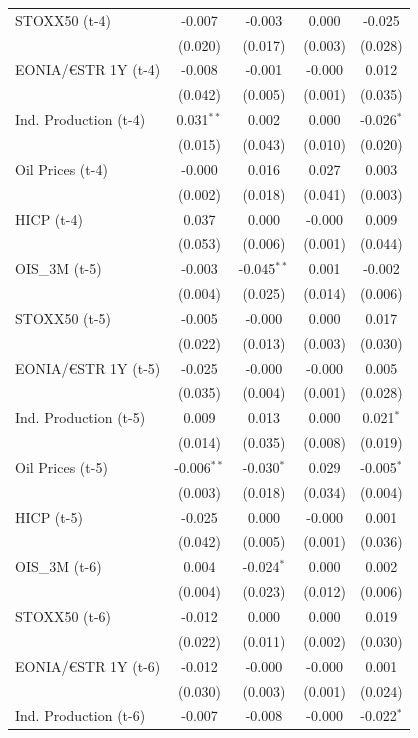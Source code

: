 \begin{longtable}[t]{lcccc}
STOXX50 (t-4) & -0.007 & -0.003 & 0.000 & -0.025\\
 & (0.020) & (0.017) & (0.003) & (0.028)\\
EONIA/€STR 1Y (t-4) & -0.008 & -0.001 & -0.000 & 0.012\\
 & (0.042) & (0.005) & (0.001) & (0.035)\\
Ind. Production (t-4) & 0.031$^{**}$ & 0.002 & 0.000 & -0.026$^{*}$\\
 & (0.015) & (0.043) & (0.010) & (0.020)\\
Oil Prices (t-4) & -0.000 & 0.016 & 0.027 & 0.003\\
 & (0.002) & (0.018) & (0.041) & (0.003)\\
HICP (t-4) & 0.037 & 0.000 & -0.000 & 0.009\\
 & (0.053) & (0.006) & (0.001) & (0.044)\\
OIS\_3M (t-5) & -0.003 & -0.045$^{**}$ & 0.001 & -0.002\\
 & (0.004) & (0.025) & (0.014) & (0.006)\\
STOXX50 (t-5) & -0.005 & -0.000 & 0.000 & 0.017\\
 & (0.022) & (0.013) & (0.003) & (0.030)\\
EONIA/€STR 1Y (t-5) & -0.025 & -0.000 & -0.000 & 0.005\\
 & (0.035) & (0.004) & (0.001) & (0.028)\\
Ind. Production (t-5) & 0.009 & 0.013 & 0.000 & 0.021$^{*}$\\
 & (0.014) & (0.035) & (0.008) & (0.019)\\
Oil Prices (t-5) & -0.006$^{**}$ & -0.030$^{*}$ & 0.029 & -0.005$^{*}$\\
 & (0.003) & (0.018) & (0.034) & (0.004)\\
HICP (t-5) & -0.025 & 0.000 & -0.000 & 0.001\\
 & (0.042) & (0.005) & (0.001) & (0.036)\\
OIS\_3M (t-6) & 0.004 & -0.024$^{*}$ & 0.000 & 0.002\\
 & (0.004) & (0.023) & (0.012) & (0.006)\\
STOXX50 (t-6) & -0.012 & 0.000 & 0.000 & 0.019\\
 & (0.022) & (0.011) & (0.002) & (0.030)\\
EONIA/€STR 1Y (t-6) & -0.012 & -0.000 & -0.000 & 0.001\\
 & (0.030) & (0.003) & (0.001) & (0.024)\\
Ind. Production (t-6) & -0.007 & -0.008 & -0.000 & -0.022$^{*}$\\

\end{longtable}

